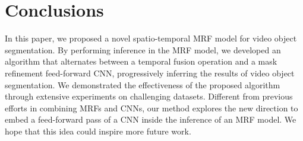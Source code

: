 \documentclass[10pt,twocolumn,letterpaper]{article}
\begin{document}
\vspace{-5pt}
\section{Conclusions}
\vspace{-5pt}

In this paper, we proposed a novel spatio-temporal MRF model for video object segmentation.
By performing inference in the MRF model, 
we developed an algorithm that alternates between a temporal fusion operation and a mask refinement feed-forward CNN, 
progressively inferring the results of video object segmentation.
We demonstrated the effectiveness of the proposed algorithm through extensive experiments on challenging datasets.
Different from previous efforts in combining MRFs and CNNs, our method explores the new direction
to embed a feed-forward pass of a CNN inside the inference of an MRF model. We hope that this idea could inspire more future work.


{\small


}
\end{document}
